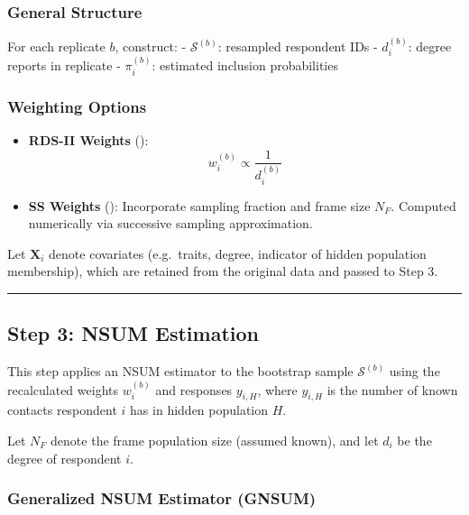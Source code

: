 \documentclass[
  12pt,
  letterpaper,
  DIV=11,
  numbers=noendperiod]{scrartcl}
\theoremstyle{plain}
\theoremstyle{definition}
\begin{document}
\subsubsection{General Structure}\label{general-structure}

For each replicate \(b\), construct: - \(\mathcal{S}^{(b)}\): resampled
respondent IDs - \(d_i^{(b)}\): degree reports in replicate -
\(\pi_i^{(b)}\): estimated inclusion probabilities

\subsubsection{Weighting Options}\label{weighting-options}

\begin{itemize}
\item
  \textbf{RDS-II Weights} (\textcite{volz08-simple}): \[
  w_i^{(b)} \propto \frac{1}{d_i^{(b)}}
  \]
\item
  \textbf{SS Weights} (\textcite{gile11-improv}): Incorporate sampling
  fraction and frame size \(N_F\). Computed numerically via successive
  sampling approximation.
\end{itemize}

Let \(\mathbf{X}_i\) denote covariates (e.g.~traits, degree, indicator
of hidden population membership), which are retained from the original
data and passed to Step 3.

\begin{center}\rule{0.5\linewidth}{0.5pt}\end{center}

\subsection{Step 3: NSUM Estimation}\label{step-3-nsum-estimation}

This step applies an NSUM estimator to the bootstrap sample
\(\mathcal{S}^{(b)}\) using the recalculated weights \(w_i^{(b)}\) and
responses \(y_{i,H}\), where \(y_{i,H}\) is the number of known contacts
respondent \(i\) has in hidden population \(H\).

Let \(N_F\) denote the frame population size (assumed known), and let
\(d_i\) be the degree of respondent \(i\).

\subsubsection{Generalized NSUM Estimator
(GNSUM)}\label{generalized-nsum-estimator-gnsum}
\end{document}
